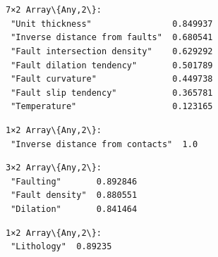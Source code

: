 \documentclass[11pt]{article}
\begin{document}
    \begin{center}
    \end{center}
    { \hspace*{\fill} \\}

    \begin{Verbatim}[commandchars=\\\{\}]

    \end{Verbatim}

    \begin{center}
    \end{center}
    { \hspace*{\fill} \\}

    \begin{Verbatim}[commandchars=\\\{\}]

    \end{Verbatim}


    \begin{Verbatim}[commandchars=\\\{\}]
7×2 Array\{Any,2\}:
 "Unit thickness"                0.849937
 "Inverse distance from faults"  0.680541
 "Fault intersection density"    0.629292
 "Fault dilation tendency"       0.501789
 "Fault curvature"               0.449738
 "Fault slip tendency"           0.365781
 "Temperature"                   0.123165
    \end{Verbatim}



    \begin{Verbatim}[commandchars=\\\{\}]
1×2 Array\{Any,2\}:
 "Inverse distance from contacts"  1.0
    \end{Verbatim}



    \begin{Verbatim}[commandchars=\\\{\}]
3×2 Array\{Any,2\}:
 "Faulting"       0.892846
 "Fault density"  0.880551
 "Dilation"       0.841464
    \end{Verbatim}



    \begin{Verbatim}[commandchars=\\\{\}]
1×2 Array\{Any,2\}:
 "Lithology"  0.89235
    \end{Verbatim}
\end{document}
